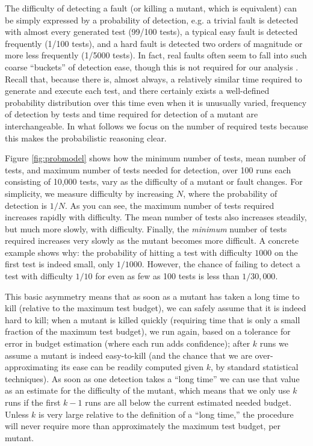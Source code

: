 \documentclass{svjour3}
\begin{document}
The difficulty of detecting a fault (or killing a mutant, which is
equivalent) can be simply expressed by a probability of detection,
e.g. a trivial fault is detected with almost every generated test
(99/100 tests), a typical easy fault is detected frequently (1/100
tests), and a hard fault is detected two orders of magnitude or more
less frequently (1/5000 tests).  In fact, real faults often seem to
fall into such coarse ``buckets'' of detection ease, though this is not
required for our analysis \cite{PLDI13}.  Recall that, because there
is, almost always, a relatively similar time required to generate and
execute each test, and there certainly exists a well-defined
probability distribution over this time even when it is unusually
varied, frequency of detection by tests and time required for
detection of a mutant are interchangeable.  In what follows we focus on
the number of required tests because this makes the probabilistic
reasoning clear.

Figure \ref{fig:probmodel} shows how the minimum number of tests, mean
number of tests, and maximum number of tests needed for detection,
over 100 runs each consisting of 10,000 tests, vary as the difficulty
of a mutant or fault changes.  For simplicity, we measure difficulty
by increasing $N$, where the probability of detection is $1/N$.  As
you can see, the maximum number of tests required increases
rapidly with difficulty.  The mean number of tests also increases steadily, but
much more slowly, with
difficulty.  Finally, the \emph{minimum} number of tests required increases very
slowly as the mutant becomes more difficult.  A concrete example shows
why: the probability of hitting a test with
difficulty $1000$ on the first test is indeed small, only $1/1000$.  However, the
chance of failing to detect a test with
difficulty $1/10$ for even as few as 100 tests is less than $1/30,000$.


This basic asymmetry means that as soon as a mutant has taken a long
time to kill (relative to the maximum test budget), we
can safely assume that it is indeed hard to kill; when a mutant is killed
quickly (requiring time that is only a small fraction of the maximum test budget), we run again, based on a tolerance for error in budget
estimation (where each run adds confidence); after $k$ runs we
assume a mutant is indeed easy-to-kill (and the chance that we are
over-approximating its ease can be readily computed given $k$, by
standard statistical techniques).  As soon as one
detection takes a ``long time'' we can use that
value as an estimate for the difficulty of the mutant, which means
that we only use $k$ runs if the first $k-1$ runs are all 
below the current estimated needed budget.  Unless $k$ is very large
relative to the definition of a ``long time,'' the procedure will
never require more than approximately the maximum test budget, per mutant.
\end{document}
